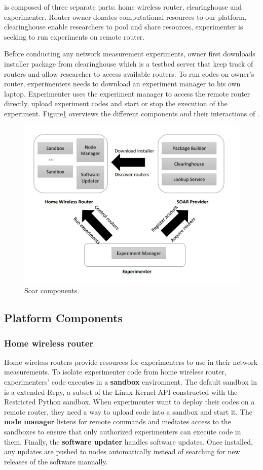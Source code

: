 \sysname is composed of three separate parts: home wireless router, clearinghouse and experimenter. Router owner donates computational resources to our platform, clearinghouse enable researchers to pool and share resources, experimenter is seeking to run experiments on remote router.

Before conducting any network measurement experiments, owner first downloads installer package from clearinghouse which is a testbed server that keep track of routers and allow researcher to access available routers. To run codes on owner's router, experimenters needs to download an experiment manager to his own laptop. Experimenter uses the experiment manager to access the remote router directly, upload experiment codes and start or stop the execution of the experiment. Figure\ref{fig-arch} overviews the different components and their interactions of \sysname.

\begin{figure}%
\centering
\includegraphics[width=0.8\columnwidth]{figure/soar-arch.png}
\caption{Soar components.}
\label{fig-arch}
\end{figure}

\subsection{Platform Components}
\subsubsection{Home wireless router}
Home wireless routers provide resources for experimenters to use in their network measurements. To isolate experimenter code from home wireless router, experimenters' code executes in a \textbf{sandbox} environment. The default sandbox in \sysname is a extended-Repy, a subset of the Linux Kernel API constructed with the Restricted Python sandbox. When experimenter want to deploy their codes on a remote router, they need a way to upload code into a sandbox and start it. The \textbf{node manager} listens for remote commands and mediates access to the sandboxes to ensure that only authorized experimenters can execute code in them. Finally, the \textbf{software updater} handles software updates. Once installed, any updates are pushed to nodes automatically instead of searching for new releases of the software manually.  
